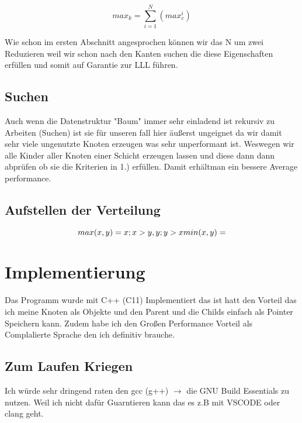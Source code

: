 \documentclass{article}
\begin{document}
\begin{equation}
	max_k =  \sum \limits_{i=1}^N  (max_c ^ i)
\end{equation}

Wie schon im ersten Abschnitt angesprochen können wir das N um zwei Reduzieren weil wir schon nach den Kanten suchen die diese Eigenschaften erfüllen und somit auf Garantie zur LLL führen.

\subsection*{ Suchen }

Auch wenn die Datenstruktur "Baum" immer sehr einladend ist rekursiv zu Arbeiten (Suchen) ist sie für unseren fall hier äußerst ungeignet da wir damit sehr viele ungenutzte Knoten erzeugen was sehr unperformant ist. Weswegen wir alle Kinder aller Knoten einer Schicht erzeugen lassen und diese dann dann abprüfen ob sie die Kriterien in 1.) erfüllen. Damit erhältman ein bessere Average performance.


\subsection*{ Aufstellen der Verteilung }


\begin{equation}
	max(x, y)  = x ; x > y , y ; y > x \newline
	min(x, y) = 	
\end{equation}



\section{ Implementierung }

Das Programm wurde mit C++ (C11) Implementiert das ist hatt den Vorteil das ich meine Knoten als Objekte und den Parent und die Childs einfach als Pointer Speichern kann. Zudem habe ich den Großen Performance Vorteil als Complalierte Sprache den ich definitiv brauche.

\subsection*{ Zum Laufen Kriegen }

Ich würde sehr dringend raten den gcc (g++) \(\rightarrow\) die GNU Build Essentials zu nutzen. Weil ich nicht dafür Guarntieren kann das es z.B mit VSCODE oder clang geht.
\end{document}
